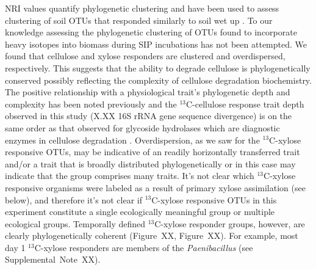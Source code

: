 NRI values quantify phylogenetic clustering \citep{Webb2000} and have 
been used to assess clustering of soil OTUs that responded similarly to soil
wet up \citep{Evans2014a,Placella2012}. To our knowledge assessing the
phylogenetic clustering of OTUs found to incorporate heavy isotopes into
biomass during SIP incubations has not been attempted. We found that cellulose
and xylose responders are clustered and overdispersed, respectively. This
suggests that the ability to degrade cellulose is phylogenetically conserved
possibly reflecting the complexity of cellulose degradation biochemistry. The
positive relationship with a physiological trait's phylogenetic depth and
complexity has been noted previously \citep{Martiny2013a} and the
$^{13}$C-cellulose response trait depth observed in this study (X.XX 16S rRNA
gene sequence divergence) is on the same order as that observed for glycoside
hydrolases which are diagnostic enzymes in cellulose degradation
\citep{Berlemont2013}. Overdispersion, as we saw for the $^{13}$C-xylose
responsive OTUs, may be indicative of an readily horizontally transferred trait
and/or a trait that is broadly distributed phylogenetically or in this case may
indicate that the group comprises many traits. It's not clear which 
$^{13}$C-xylose responsive organisms were labeled as a result of primary xylose
assimilation (see below), and therefore it's not clear if $^{13}$C-xylose
responsive OTUs in this experiment constitute a single ecologically meaningful
group or multiple ecological groups. Temporally defined $^{13}$C-xylose
responder groups, however, are clearly phylogenetically coherent (Figure~XX,
Figure~XX). For example, most day 1 $^{13}$C-xylose responders are members of
the \textit{Paenibacillus} (see Supplemental~Note~XX).

